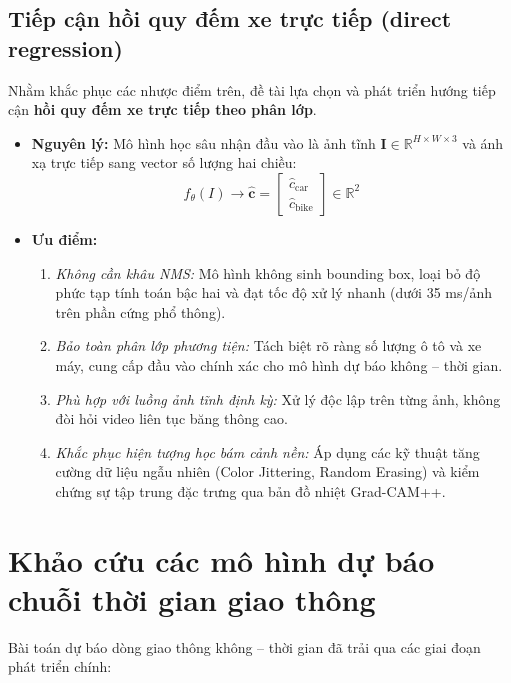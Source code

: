 \subsection{Tiếp cận hồi quy đếm xe trực tiếp (direct regression)}
Nhằm khắc phục các nhược điểm trên, đề tài lựa chọn và phát triển hướng tiếp cận \textbf{hồi quy đếm xe trực tiếp theo phân lớp}.
\begin{itemize}
    \item \textbf{Nguyên lý:} Mô hình học sâu nhận đầu vào là ảnh tĩnh $\mathbf{I} \in \mathbb{R}^{H \times W \times 3}$ và ánh xạ trực tiếp sang vector số lượng hai chiều:
    \begin{equation}
        f_\theta(I) \longrightarrow \hat{\mathbf{c}} = \begin{bmatrix} \hat{c}_{\text{car}} \\ \hat{c}_{\text{bike}} \end{bmatrix} \in \mathbb{R}^2
    \end{equation}
    \item \textbf{Ưu điểm:}
    \begin{enumerate}
        \item \textit{Không cần khâu NMS:} Mô hình không sinh bounding box, loại bỏ độ phức tạp tính toán bậc hai và đạt tốc độ xử lý nhanh (dưới 35 ms/ảnh trên phần cứng phổ thông).
        \item \textit{Bảo toàn phân lớp phương tiện:} Tách biệt rõ ràng số lượng ô tô và xe máy, cung cấp đầu vào chính xác cho mô hình dự báo không -- thời gian.
        \item \textit{Phù hợp với luồng ảnh tĩnh định kỳ:} Xử lý độc lập trên từng ảnh, không đòi hỏi video liên tục băng thông cao.
        \item \textit{Khắc phục hiện tượng học bám cảnh nền:} Áp dụng các kỹ thuật tăng cường dữ liệu ngẫu nhiên (Color Jittering, Random Erasing) và kiểm chứng sự tập trung đặc trưng qua bản đồ nhiệt Grad-CAM++.
    \end{enumerate}
\end{itemize}

\section{Khảo cứu các mô hình dự báo chuỗi thời gian giao thông}
Bài toán dự báo dòng giao thông không -- thời gian đã trải qua các giai đoạn phát triển chính:

